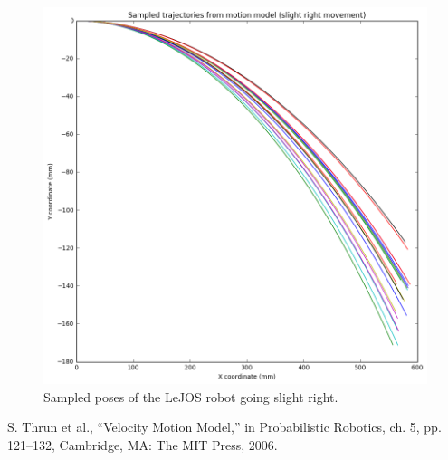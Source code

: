 \documentclass[paper=a4, fontsize=11pt]{scrartcl} %
\begin{document}
    \begin{figure}[h!]
        \begin{center}
            \setlength{\fboxsep}{0.5pt} %
            \setlength{\fboxrule}{0.5pt}
            \includegraphics[width=12cm,fbox]{images/sampled_poses_slightRight.png}
            \caption{Sampled poses of the LeJOS robot going slight right.}
        \end{center}
    \end{figure}
    
    \begin{thebibliography}{9}
    	S. Thrun et al., “Velocity Motion Model,” in Probabilistic Robotics, ch. 5, pp. 121–132, Cambridge,
    	MA: The MIT Press, 2006.
    \end{thebibliography}
\end{document}
